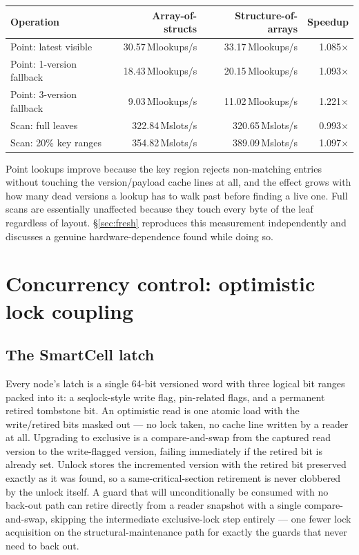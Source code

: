 \documentclass[11pt]{article}
\begin{document}
\begin{center}
\begin{tabular}{lrrr}
\toprule
Operation & Array-of-structs & Structure-of-arrays & Speedup \\
\midrule
Point: latest visible & 30.57\,Mlookups/s & 33.17\,Mlookups/s & 1.085$\times$ \\
Point: 1-version fallback & 18.43\,Mlookups/s & 20.15\,Mlookups/s & 1.093$\times$ \\
Point: 3-version fallback & 9.03\,Mlookups/s & 11.02\,Mlookups/s & 1.221$\times$ \\
Scan: full leaves & 322.84\,Mslots/s & 320.65\,Mslots/s & 0.993$\times$ \\
Scan: 20\% key ranges & 354.82\,Mslots/s & 389.09\,Mslots/s & 1.097$\times$ \\
\bottomrule
\end{tabular}
\end{center}

Point lookups improve because the key region rejects non-matching entries without
touching the version/payload cache lines at all, and the effect grows with how many
dead versions a lookup has to walk past before finding a live one. Full scans are
essentially unaffected because they touch every byte of the leaf regardless of
layout. \S\ref{sec:fresh} reproduces this measurement independently and discusses a
genuine hardware-dependence found while doing so.

\section{Concurrency control: optimistic lock coupling}
\label{sec:cc}

\subsection{The SmartCell latch}

Every node's latch is a single 64-bit versioned word with three logical bit ranges
packed into it: a seqlock-style write flag, pin-related flags, and a permanent
retired tombstone bit. An optimistic read is one atomic load with the write/retired
bits masked out --- no lock taken, no cache line written by a reader at all.
Upgrading to exclusive is a compare-and-swap from the captured read version to the
write-flagged version, failing immediately if the retired bit is already set. Unlock
stores the incremented version with the retired bit preserved exactly as it was
found, so a same-critical-section retirement is never clobbered by the unlock itself.
A guard that will unconditionally be consumed with no back-out path can retire
directly from a reader snapshot with a single compare-and-swap, skipping the
intermediate exclusive-lock step entirely --- one fewer lock acquisition on the
structural-maintenance path for exactly the guards that never need to back out.
\end{document}
